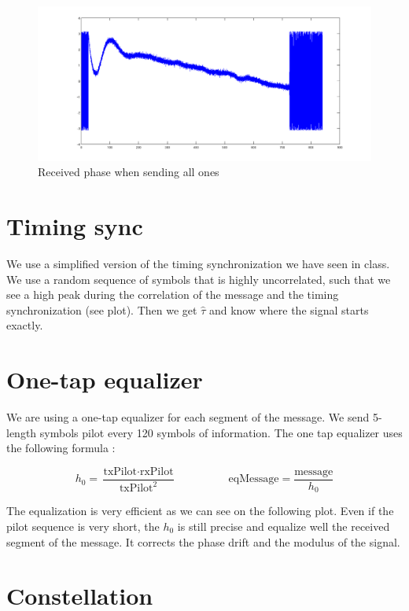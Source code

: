 \documentclass{article}
\begin{document}
\begin{figure}
  \centering\includegraphics[width=\textwidth]{../presentation/phase.png}
  \caption{Received phase when sending all ones}
  \label{fig:phase}
\end{figure}

\section{Timing sync}

We use a simplified version of the timing synchronization we have seen in class. We use a random sequence of symbols that is highly uncorrelated, such that we see a high peak during the correlation of the message and the timing synchronization (see plot). Then we get $\hat\tau$ and know where the signal starts exactly. 


\section{One-tap equalizer}

We are using a one-tap equalizer for each segment of the message. We send 5-length symbols pilot every 120 symbols of information. The one tap equalizer uses the following formula :

\[
  h_0 = \frac{\text{txPilot} \cdot \text{rxPilot}}{\text{txPilot}^2}
  \hspace{2cm}
  \text{eqMessage} = \frac{\text{message}}{h_0}
\]

The equalization is very efficient as we can see on the following plot. Even if the pilot sequence is very short, the $h_0$ is still precise and equalize well the received segment of the message. It corrects the phase drift and the modulus of the signal. 


\section{Constellation}
\end{document}
